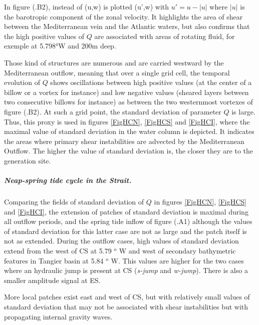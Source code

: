 In figure (.B2), instead of (u,w) is plotted (u',w) with $u'=u-|u|$ where $|u|$ is the barotropic component of the zonal velocity. It highlights the area of shear between the Mediterranean vein and the Atlantic waters, but also confirms that the high positive values of $Q$ are associated with areas of rotating fluid, for exemple at 5.798°W and 200m deep. 

Those kind of structures are numerous and are carried westward by the Mediterranean outflow, meaning that over a single grid cell, the temporal evolution of $Q$ shows oscillations between high positive values (at the center of a billow or a vortex for instance) and low negative values (sheared layers between two consecutive billows for instance) as between the two westernmost vortexes of figure (.B2). At such a grid point, the standard deviation of parameter $Q$ is large. Thus, this proxy is used in figures \ref{FigHCN}, \ref{FigHCS} and \ref{FigHCI}, where the maximal value of standard deviation in the water column is depicted. It indicates the areas where primary shear instabilities are advected by the Mediterranean Outflow. The higher the value of standard deviation is, the closer they are to the generation site.

\subparagraph{Neap-spring tide cycle in the Strait.}
Comparing the fields of standard deviation of $Q$ in figures \ref{FigHCN}, \ref{FigHCS} and \ref{FigHCI}, the extension of patches of standard deviation is maximal during all outflow periods, and the spring tide inflow of figure (.A1) although the values of standard deviation for this latter case are not as large and the patch itself is not as extended. During the outflow cases, high values of standard deviation extend from the west of CS at 5.79 $^\text{o}$ W and west of secondary bathymetric features in Tangier basin at 5.84 $^\text{o}$ W. This values are higher for the two cases where an hydraulic jump is present at CS (\textit{s-jump} and \textit{w-jump}). There is also a smaller amplitude signal at ES.

More local patches exist east and west of CS, but with relatively small values of standard deviation that may not be associated with shear instabilities but with propagating internal gravity waves.


